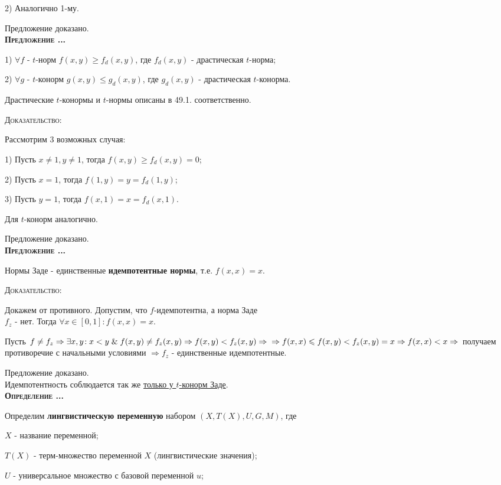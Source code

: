 \documentclass[18pt, a4paper]{extarticle}
\newcounter{par}
\newcounter{spar}
\newcounter{zap}
\newcommand{\opr}{\textbf{\textsc{Определение \thepar.\if\thespar1\thespar.\fi\thezap.\;}}\stepcounter{zap}}
\newcommand{\predl}{\textbf{\textsc{Предложение \thepar.\if\thespar1\thespar.\fi\thezap.\;}}\stepcounter{zap}}
\newcommand{\dok}{\textsc{Доказательство:}}
\newcommand{\ampersand}{\;\&\;}
\begin{document}
2) Аналогично 1-му.

Предложение доказано.\\

\predl


1) $\forall f$ - $t$-норм $f(x,y)\geqslant f_d(x,y)$, где $f_d(x,y)$ - драстическая $t$-норма;

2) $\forall g$ - $t$-конорм $g(x,y)\leqslant g_d(x,y)$, где $g_d(x,y)$ - драстическая $t$-конорма.

Драстические $t$-конормы и $t$-нормы описаны в 49.1. соответственно.\newpage

\dok

Рассмотрим 3 возможных случая:

1) Пусть $x\neq 1,y\neq1$, тогда $f(x,y)\geqslant f_d(x,y)=0$;

2) Пусть $x=1$, тогда $f(1,y)=y=f_d(1,y)$;

3) Пусть $y=1$, тогда $f(x,1)=x=f_d(x,1)$.

Для $t$-конорм аналогично.

Предложение доказано.\\

\predl

Нормы Заде - единственные \textbf{идемпотентные нормы}, т.е. $f(x,x)=x$.  

\dok

Докажем от противного. Допустим, что $f$-идемпотентна, а норма Заде\\$f_z$ - нет. Тогда $\forall x\in[0,1]\!:f(x,x)=x$.

Пусть $f\neq f_z\Rightarrow\exists x,y\!: x<y\ampersand f(x,y)\neq f_z(x,y)\Rightarrow f(x,y)<f_z(x,y)\Rightarrow\newline\Rightarrow f(x,x)\leqslant f(x,y)<f_z(x,y)=x\Rightarrow f(x,x)<x\Rightarrow$ получаем противоречие с начальными условиями $\Rightarrow f_z$ - единственные идемпотентные.

Предложение доказано.\\

Идемпотентность соблюдается так же \underline{только у $t$-конорм Заде}.\\

\opr

Определим \textbf{лингвистическую переменную} набором $(X, T(X), U, G, M)$, где

$X$ - название переменной;

$T(X)$ - терм-множество переменной $X$ (лингвистические значения);

$U$ - универсальное множество с базовой переменной $u$;
\end{document}

